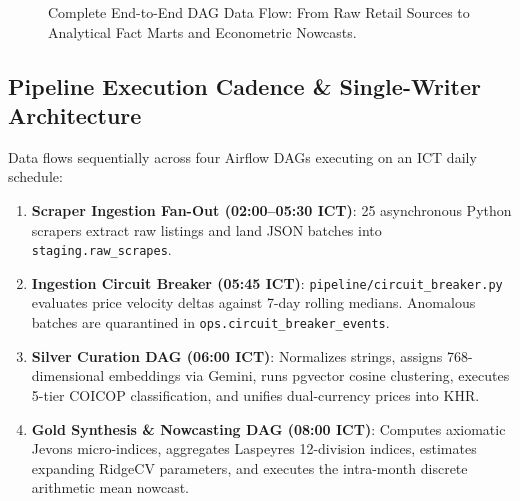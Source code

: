 \documentclass[a4paper, 11pt]{article}
\begin{document}
\begin{figure}[H]
\caption{Complete End-to-End DAG Data Flow: From Raw Retail Sources to Analytical Fact Marts and Econometric Nowcasts.}
\end{figure}

\subsection{Pipeline Execution Cadence \& Single-Writer Architecture}
Data flows sequentially across four Airflow DAGs executing on an ICT daily schedule:
\begin{enumerate}[leftmargin=*]
    \item \textbf{Scraper Ingestion Fan-Out (02:00--05:30 ICT)}: 25 asynchronous Python scrapers extract raw listings and land JSON batches into \texttt{staging.raw\_scrapes}.
    \item \textbf{Ingestion Circuit Breaker (05:45 ICT)}: \texttt{pipeline/circuit\_breaker.py} evaluates price velocity deltas against 7-day rolling medians. Anomalous batches are quarantined in \texttt{ops.circuit\_breaker\_events}.
    \item \textbf{Silver Curation DAG (06:00 ICT)}: Normalizes strings, assigns 768-dimensional embeddings via Gemini, runs pgvector cosine clustering, executes 5-tier COICOP classification, and unifies dual-currency prices into KHR.
    \item \textbf{Gold Synthesis \& Nowcasting DAG (08:00 ICT)}: Computes axiomatic Jevons micro-indices, aggregates Laspeyres 12-division indices, estimates expanding RidgeCV parameters, and executes the intra-month discrete arithmetic mean nowcast.
\end{enumerate}
\end{document}
